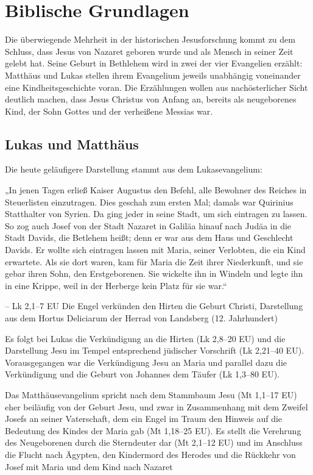 
\chapter{Biblische Grundlagen}
\label{chapter-basics}

Die überwiegende Mehrheit in der historischen Jesusforschung kommt zu dem Schluss, dass Jesus von Nazaret geboren wurde und als Mensch in seiner Zeit gelebt hat. Seine Geburt in Bethlehem wird in zwei der vier Evangelien erzählt: Matthäus und Lukas stellen ihrem Evangelium jeweils unabhängig voneinander eine Kindheitsgeschichte voran. Die Erzählungen wollen aus nachösterlicher Sicht deutlich machen, dass Jesus Christus von Anfang an, bereits als neugeborenes Kind, der Sohn Gottes und der verheißene Messias war.\cite {rltl}

\section{Lukas und Matthäus}

Die heute geläufigere Darstellung stammt aus dem Lukasevangelium:

    „In jenen Tagen erließ Kaiser Augustus den Befehl, alle Bewohner des Reiches in Steuerlisten einzutragen. Dies geschah zum ersten Mal; damals war Quirinius Statthalter von Syrien. Da ging jeder in seine Stadt, um sich eintragen zu lassen.
    So zog auch Josef von der Stadt Nazaret in Galiläa hinauf nach Judäa in die Stadt Davids, die Betlehem heißt; denn er war aus dem Haus und Geschlecht Davids. Er wollte sich eintragen lassen mit Maria, seiner Verlobten, die ein Kind erwartete. Als sie dort waren, kam für Maria die Zeit ihrer Niederkunft, und sie gebar ihren Sohn, den Erstgeborenen. Sie wickelte ihn in Windeln und legte ihn in eine Krippe, weil in der Herberge kein Platz für sie war.“

– Lk 2,1–7 EU
Die Engel verkünden den Hirten die Geburt Christi, Darstellung aus dem Hortus Deliciarum der Herrad von Landsberg (12. Jahrhundert)

Es folgt bei Lukas die Verkündigung an die Hirten (Lk 2,8–20 EU) und die Darstellung Jesu im Tempel entsprechend jüdischer Vorschrift (Lk 2,21–40 EU). Vorausgegangen war die Verkündigung Jesu an Maria und parallel dazu die Verkündigung und die Geburt von Johannes dem Täufer (Lk 1,3–80 EU).

Das Matthäusevangelium spricht nach dem Stammbaum Jesu (Mt 1,1–17 EU) eher beiläufig von der Geburt Jesu, und zwar in Zusammenhang mit dem Zweifel Josefs an seiner Vaterschaft, dem ein Engel im Traum den Hinweis auf die Bedeutung des Kindes der Maria gab (Mt 1,18–25 EU). Es stellt die Verehrung des Neugeborenen durch die Sterndeuter dar (Mt 2,1–12 EU) und im Anschluss die Flucht nach Ägypten, den Kindermord des Herodes und die Rückkehr von Josef mit Maria und dem Kind nach Nazaret 

